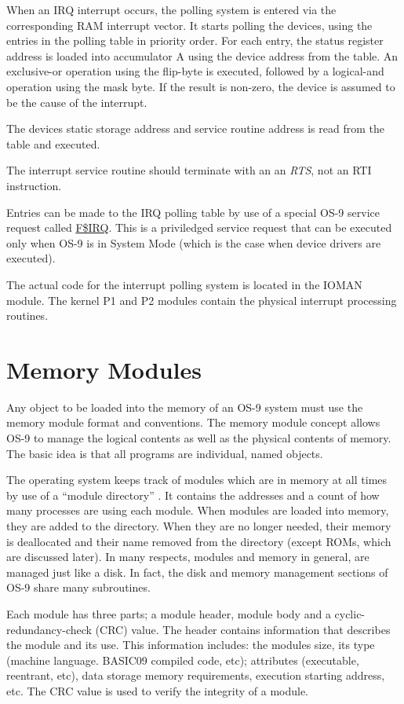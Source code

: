 \documentclass[
]{article}
\begin{document}
When an IRQ interrupt occurs, the polling system is entered via the
corresponding RAM interrupt vector. It starts polling the devices, using
the entries in the polling table in priority order. For each entry, the
status register address is loaded into accumulator A using the device
address from the table. An exclusive-or operation using the flip-byte is
executed, followed by a logical-and operation using the mask byte. If
the result is non-zero, the device is assumed to be the cause of the
interrupt.

The device\textquotesingle s static storage address and service routine
address is read from the table and executed.

The interrupt service routine should terminate with an an \emph{RTS},
not an RTI instruction.

Entries can be made to the IRQ polling table by use of a special OS-9
service request called \hyperref[f.irq]{F\$IRQ}. This is a priviledged
service request that can be executed only when OS-9 is in System Mode
(which is the case when device drivers are executed).

The actual code for the interrupt polling system is located in the IOMAN
module. The kernel P1 and P2 modules contain the physical interrupt
processing routines.

\section{Memory Modules}

Any object to be loaded into the memory of an OS-9 system must use the
memory module format and conventions. The memory module concept allows
OS-9 to manage the logical contents as well as the physical contents of
memory. The basic idea is that all programs are individual, named
objects.

The operating system keeps track of modules which are in memory at all
times by use of a ``module directory'' . It contains the addresses and a
count of how many processes are using each module. When modules are
loaded into memory, they are added to the directory. When they are no
longer needed, their memory is deallocated and their name removed from
the directory (except ROMs, which are discussed later). In many
respects, modules and memory in general, are managed just like a disk.
In fact, the disk and memory management sections of OS-9 share many
subroutines.

Each module has three parts; a module header, module body and a
cyclic-redundancy-check (CRC) value. The header contains information
that describes the module and its use. This information includes: the
modules size, its type (machine language. BASIC09 compiled code, etc);
attributes (executable, reentrant, etc), data storage memory
requirements, execution starting address, etc. The CRC value is used to
verify the integrity of a module.
\end{document}
